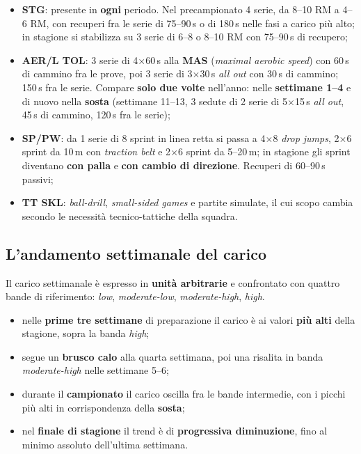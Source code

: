 \begin{itemize}
  \item \textbf{STG}: presente in \textbf{ogni} periodo. Nel precampionato 4 serie, da 8--10 RM a
    4--6 RM, con recuperi fra le serie di 75--90\,s o di 180\,s nelle fasi a carico più alto; in
    stagione si stabilizza su 3 serie di 6--8 o 8--10 RM con 75--90\,s di recupero;
  \item \textbf{AER/L TOL}: 3 serie di 4$\times$60\,s alla \textbf{MAS} (\textit{maximal aerobic
    speed}) con 60\,s di cammino fra le prove, poi 3 serie di 3$\times$30\,s \textit{all out} con
    30\,s di cammino; 150\,s fra le serie. Compare \textbf{solo due volte} nell'anno: nelle
    \textbf{settimane 1--4} e di nuovo nella \textbf{sosta} (settimane 11--13, 3 sedute di
    2 serie di 5$\times$15\,s \textit{all out}, 45\,s di cammino, 120\,s fra le serie);
  \item \textbf{SP/PW}: da 1 serie di 8 sprint in linea retta si passa a
    4$\times$8 \textit{drop jumps}, 2$\times$6 sprint da 10\,m con \textit{traction belt} e
    2$\times$6 sprint da 5--20\,m; in stagione gli sprint diventano \textbf{con palla} e
    \textbf{con cambio di direzione}. Recuperi di 60--90\,s passivi;
  \item \textbf{TT SKL}: \textit{ball-drill}, \textit{small-sided games} e partite simulate, il cui
    scopo cambia secondo le necessità tecnico-tattiche della squadra.
\end{itemize}

\subsection{L'andamento settimanale del carico}

Il carico settimanale è espresso in \textbf{unità arbitrarie} e confrontato con quattro bande di
riferimento: \textit{low}, \textit{moderate-low}, \textit{moderate-high}, \textit{high}.

\begin{itemize}
  \item nelle \textbf{prime tre settimane} di preparazione il carico è ai valori
    \textbf{più alti} della stagione, sopra la banda \textit{high};
  \item segue un \textbf{brusco calo} alla quarta settimana, poi una risalita in banda
    \textit{moderate-high} nelle settimane 5--6;
  \item durante il \textbf{campionato} il carico oscilla fra le bande intermedie, con i picchi
    più alti in corrispondenza della \textbf{sosta};
  \item nel \textbf{finale di stagione} il trend è di \textbf{progressiva diminuzione}, fino al
    minimo assoluto dell'ultima settimana.
\end{itemize}

